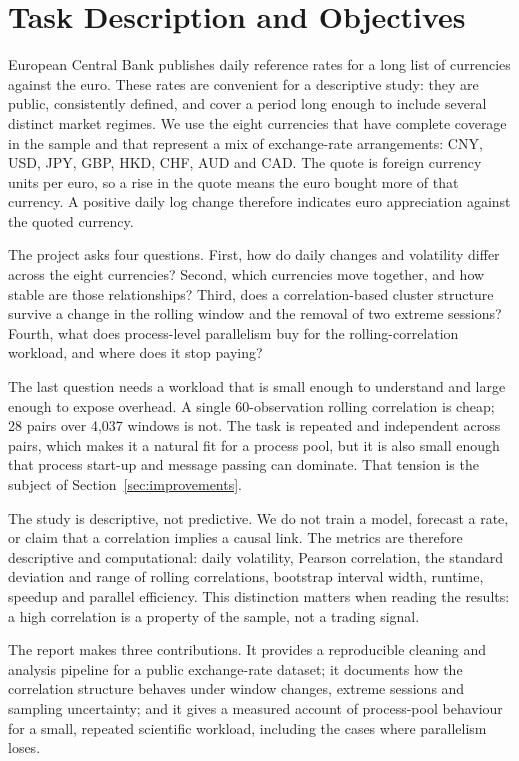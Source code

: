 \documentclass[journal]{IEEEtran}
\begin{document}
\section{Task Description and Objectives}
\label{sec:task}

 European Central Bank publishes daily reference rates for a long list of currencies against the euro. These rates are convenient for a descriptive study: they are public, consistently defined, and cover a period long enough to include several distinct market regimes. We use the eight currencies that have complete coverage in the sample and that represent a mix of exchange-rate arrangements: CNY, USD, JPY, GBP, HKD, CHF, AUD and CAD. The quote is foreign currency units per euro, so a rise in the quote means the euro bought more of that currency. A positive daily log change therefore indicates euro appreciation against the quoted currency.

The project asks four questions. First, how do daily changes and volatility differ across the eight currencies? Second, which currencies move together, and how stable are those relationships? Third, does a correlation-based cluster structure survive a change in the rolling window and the removal of two extreme sessions? Fourth, what does process-level parallelism buy for the rolling-correlation workload, and where does it stop paying?

The last question needs a workload that is small enough to understand and large enough to expose overhead. A single 60-observation rolling correlation is cheap; 28 pairs over 4,037 windows is not. The task is repeated and independent across pairs, which makes it a natural fit for a process pool, but it is also small enough that process start-up and message passing can dominate. That tension is the subject of Section~\ref{sec:improvements}.

The study is descriptive, not predictive. We do not train a model, forecast a rate, or claim that a correlation implies a causal link. The metrics are therefore descriptive and computational: daily volatility, Pearson correlation, the standard deviation and range of rolling correlations, bootstrap interval width, runtime, speedup and parallel efficiency. This distinction matters when reading the results: a high correlation is a property of the sample, not a trading signal.

The report makes three contributions. It provides a reproducible cleaning and analysis pipeline for a public exchange-rate dataset; it documents how the correlation structure behaves under window changes, extreme sessions and sampling uncertainty; and it gives a measured account of process-pool behaviour for a small, repeated scientific workload, including the cases where parallelism loses.
\end{document}
